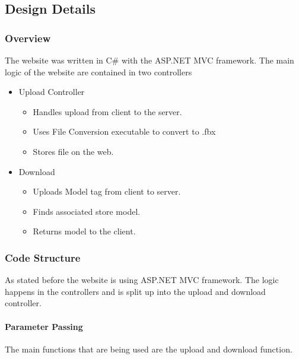\subsection{Design Details}

    \subsubsection{Overview}

    The website was written in C\# with the ASP.NET MVC framework. The main logic
    of the website are contained in two controllers
    \begin{itemize}
        \item Upload Controller
        \begin{itemize}
            \item Handles upload from client to the server.
            \item Uses File Conversion executable to convert to .fbx
            \item Stores file on the web.
        \end{itemize}
        \item Download
        \begin{itemize}
            \item Uploads Model tag from client to server.
            \item Finds associated store model.
            \item Returns model to the client.
        \end{itemize}
    \end{itemize}

    \subsubsection{Code Structure}
    As stated before the website is using ASP.NET MVC framework. 
    The logic happens in the controllers and is split up into the upload and download controller.
    
    \paragraph{Parameter Passing}
    \hfill \break
    The main functions that are being used are the upload and download function.
    
